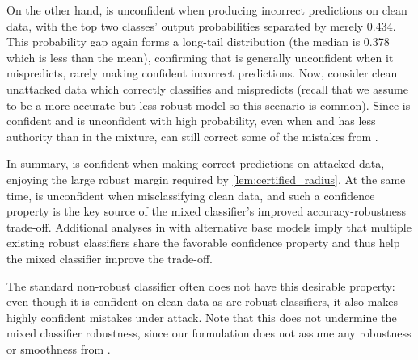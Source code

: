 \documentclass[11pt, letterpaper]{article}
\theoremstyle{plain}
\theoremstyle{definition}
\begin{document}
On the other hand,  is unconfident when producing incorrect predictions on clean data, with the top two classes' output probabilities separated by merely 0.434. This probability gap again forms a long-tail distribution (the median is 0.378 which is less than the mean), confirming that  is generally unconfident when it mispredicts, rarely making confident incorrect predictions. Now, consider clean unattacked data which  correctly classifies and  mispredicts (recall that we assume  to be a more accurate but less robust model so this scenario is common). Since  is confident and  is unconfident with high probability, even when  and  has less authority than  in the mixture,  can still correct some of the mistakes from .

In summary,  is confident when making correct predictions on attacked data, enjoying the large robust margin required by \cref{lem:certified_radius}. At the same time,  is unconfident when misclassifying clean data, and such a confidence property is the key source of the mixed classifier's improved accuracy-robustness trade-off. Additional analyses in  with alternative base models imply that multiple existing robust classifiers share the favorable confidence property and thus help the mixed classifier improve the trade-off.

The standard non-robust classifier  often does not have this desirable property: even though it is confident on clean data as are robust classifiers, it also makes highly confident mistakes under attack. Note that this does not undermine the mixed classifier robustness, since our formulation does not assume any robustness or smoothness from .
\end{document}
